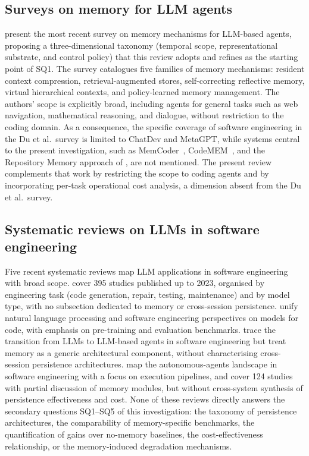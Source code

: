 \subsection{Surveys on memory for LLM agents}
\label{sec:rel-memoria}

\citet{du2026memory} present the most recent survey on memory
mechanisms for LLM-based agents, proposing a three-dimensional taxonomy
(temporal scope, representational substrate, and control policy) that
this review adopts and refines as the starting point of SQ1.
The survey catalogues five families of memory mechanisms: resident
context compression, retrieval-augmented stores, self-correcting
reflective memory, virtual hierarchical contexts, and policy-learned
memory management.
The authors' scope is explicitly broad, including agents for general
tasks such as web navigation, mathematical reasoning, and dialogue,
without restriction to the coding domain.
As a consequence, the specific coverage of software engineering in the
Du et al.\ survey is limited to ChatDev and MetaGPT, while systems
central to the present investigation, such as
MemCoder~\citep{deng2026memcoder},
CodeMEM~\citep{wang2026codemem}, and the Repository Memory approach of
\citet{wang2026improving}, are not mentioned.
The present review complements that work by restricting the scope to
coding agents and by incorporating per-task operational cost analysis,
a dimension absent from the Du et al.\ survey.

\subsection{Systematic reviews on LLMs in software engineering}
\label{sec:rel-llmse}

Five recent systematic reviews map LLM applications in software
engineering with broad scope.
\citet{hou2024llmse} cover 395 studies published up to 2023, organised
by engineering task (code generation, repair, testing, maintenance) and
by model type, with no subsection dedicated to memory or cross-session
persistence.
\citet{zhang2024unifying} unify natural language processing and
software engineering perspectives on models for code, with emphasis on
pre-training and evaluation benchmarks.
\citet{jin2024llmagents} trace the transition from LLMs to LLM-based
agents in software engineering but treat memory as a generic
architectural component, without characterising cross-session
persistence architectures.
\citet{wang2024llmagents} map the autonomous-agents landscape in
software engineering with a focus on execution pipelines, and
\citet{liu2024llmagents} cover 124 studies with partial discussion of
memory modules, but without cross-system synthesis of persistence
effectiveness and cost.
None of these reviews directly answers the secondary questions SQ1--SQ5
of this investigation: the taxonomy of persistence architectures, the
comparability of memory-specific benchmarks, the quantification of
gains over no-memory baselines, the cost-effectiveness relationship, or
the memory-induced degradation mechanisms.

